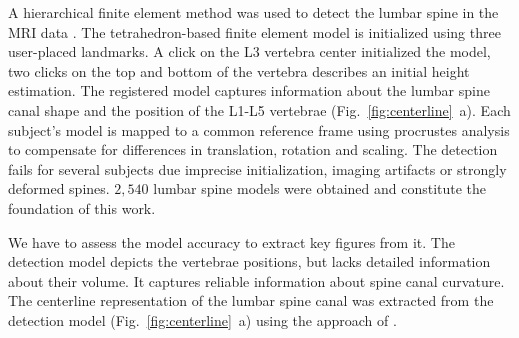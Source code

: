 \documentclass[a4paper,twoside]{style/article}
\newcommand{\com}[1]{\textcolor{orange}{\uline{#1}}}
\begin{document}
A hierarchical finite element method was used to detect the lumbar spine in the MRI data \cite{Rak2013}.
The tetrahedron-based finite element model is initialized using three user-placed landmarks.
A click on the L3 vertebra center initialized the model, two clicks on the top and bottom of the vertebra describes an initial height estimation.
The registered model captures information about the lumbar spine canal shape and the position of the L1-L5 vertebrae \cite{Klemm2013VMV} (Fig.~\ref{fig:centerline}~a).
Each subject's model is mapped to a common reference frame using procrustes analysis to compensate for differences in translation, 
rotation and scaling.
The detection fails for several subjects due imprecise initialization, imaging artifacts or strongly deformed spines.
$2,540$ lumbar spine models were obtained and constitute the foundation of this work.

We have to assess the model accuracy to extract key figures from it.
The detection model depicts the vertebrae positions, but lacks detailed information about their volume.
It captures reliable information about spine canal curvature.
The centerline representation of the lumbar spine canal was extracted from the detection model (Fig.~\ref{fig:centerline}~a) using the approach of \cite{Klemm2013VMV}.
\end{document}
